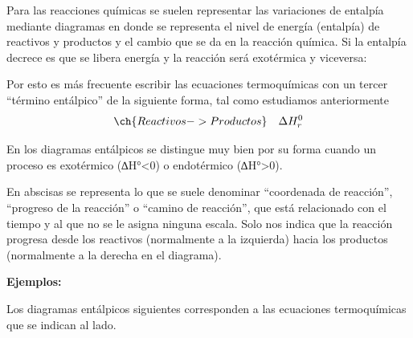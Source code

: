 \documentclass[
  spanish,
]{article}
\begin{document}
Para las reacciones químicas se suelen representar las variaciones de
entalpía mediante diagramas en donde se representa el nivel de energía
(entalpía) de reactivos y productos y el cambio que se da en la reacción
química. Si la entalpía decrece es que se libera energía y la reacción
será exotérmica y viceversa:

\hfill{}

Por esto es más frecuente escribir las ecuaciones termoquímicas con un
tercer ``término entálpico'' de la siguiente forma, tal como estudiamos
anteriormente \[\ch{Reactivos -> Productos} \quad \Delta H_{r}^{0}\]

En los diagramas entálpicos se distingue muy bien por su forma cuando un
proceso es exotérmico (∆H°\textless0) o endotérmico (∆H°\textgreater0).

En abscisas se representa lo que se suele denominar ``coordenada de
reacción'', ``progreso de la reacción'' o ``camino de reacción'', que
está relacionado con el tiempo y al que no se le asigna ninguna escala.
Solo nos indica que la reacción progresa desde los reactivos
(normalmente a la izquierda) hacia los productos (normalmente a la
derecha en el diagrama).

\textbf{Ejemplos:}

Los diagramas entálpicos siguientes corresponden a las ecuaciones
termoquímicas que se indican al lado.

\hfill{}
\end{document}
